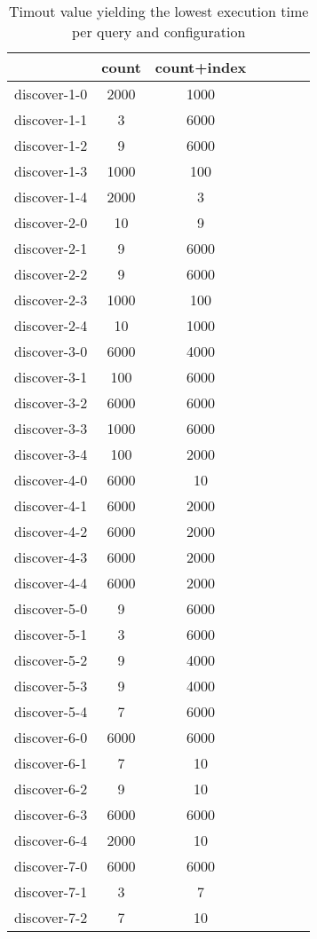 \documentclass[preview]{standalone}
\begin{document}
 
\begin{table}[!ht] %
\caption{Timout value yielding the lowest execution time per query and configuration} 
\centering 
\begin{tabular}{lcccccc} 
& count & count+index \\ \hline 
discover-1-0 & 2000 & 1000 \\ 
 discover-1-1 & 3 & 6000 \\ 
 discover-1-2 & 9 & 6000 \\ 
 discover-1-3 & 1000 & 100 \\ 
 discover-1-4 & 2000 & 3 \\ 
 discover-2-0 & 10 & 9 \\ 
 discover-2-1 & 9 & 6000 \\ 
 discover-2-2 & 9 & 6000 \\ 
 discover-2-3 & 1000 & 100 \\ 
 discover-2-4 & 10 & 1000 \\ 
 discover-3-0 & 6000 & 4000 \\ 
 discover-3-1 & 100 & 6000 \\ 
 discover-3-2 & 6000 & 6000 \\ 
 discover-3-3 & 1000 & 6000 \\ 
 discover-3-4 & 100 & 2000 \\ 
 discover-4-0 & 6000 & 10 \\ 
 discover-4-1 & 6000 & 2000 \\ 
 discover-4-2 & 6000 & 2000 \\ 
 discover-4-3 & 6000 & 2000 \\ 
 discover-4-4 & 6000 & 2000 \\ 
 discover-5-0 & 9 & 6000 \\ 
 discover-5-1 & 3 & 6000 \\ 
 discover-5-2 & 9 & 4000 \\ 
 discover-5-3 & 9 & 4000 \\ 
 discover-5-4 & 7 & 6000 \\ 
 discover-6-0 & 6000 & 6000 \\ 
 discover-6-1 & 7 & 10 \\ 
 discover-6-2 & 9 & 10 \\ 
 discover-6-3 & 6000 & 6000 \\ 
 discover-6-4 & 2000 & 10 \\ 
 discover-7-0 & 6000 & 6000 \\ 
 discover-7-1 & 3 & 7 \\ 
 discover-7-2 & 7 & 10 \\ 

\end{tabular}
\end{table}
\end{document}
